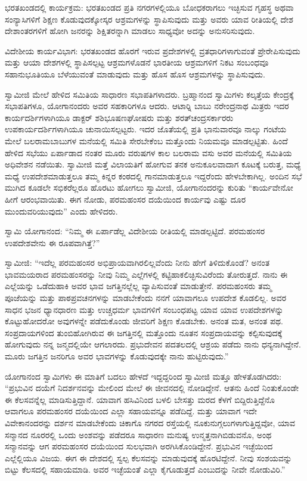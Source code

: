  ಭರತಖಂಡದಲ್ಲಿ ಕಾರ್ಯಕ್ರಮ: ಭರತಖಂಡದ ಪ್ರತಿ ನಗರಗಳಲ್ಲಿಯೂ ಬೋಧಕರಾಗಲು ಇಚ್ಛಿಸುವ ಗೃಹಸ್ಥ ಅಥವಾ ಸಂನ್ಯಾಸಿಗಳಿಗೆ ಶಿಕ್ಷಣ ಕೊಡುವುದಕ್ಕೋಸ್ಕರ ಆಶ್ರಮಗಳನ್ನು ಸ್ಥಾಪಿಸುವುದು ಮತ್ತು ಅವರು ಯಾವ ರೀತಿಯಲ್ಲಿ ದೇಶ ದೇಶಾಂತರಗಳಿಗೆ ಹೋಗಿ ಜನರನ್ನು ಶಿಕ್ಷಿತರನ್ನಾಗಿ ಮಾಡಲು ಸಾಧ್ಯವೋ ಅದನ್ನು ಅನುಸರಿಸುವುದು. 

 ವಿದೇಶೀಯ ಕಾರ್ಯವಿಭಾಗ: ಭರತಖಂಡದ ಹೊರಗೆ ಇರುವ ಪ್ರದೇಶಗಳಲ್ಲಿ ವ್ರತಧಾರಿಗಳಾಗುವಂತೆ ಪ್ರೇರೇಪಿಸುವುದು ಮತ್ತು ಆಯಾ ದೇಶಗಳಲ್ಲಿ ಸ್ಥಾಪಿಸಲ್ಪಟ್ಟ ಆಶ್ರಮಗಳೊಡನೆ ಭಾರತೀಯ ಆಶ್ರಮಗಳಿಗೆ ನಿಕಟ ಸಂಬಂಧವೂ ಸಹಾನುಭೂತಿಯೂ ಬೆಳೆಯುವಂತೆ ಮಾಡುವುದು ಮತ್ತು ಹೊಸ ಹೊಸ ಆಶ್ರಮಗಳನ್ನು ಸ್ಥಾಪಿಸುವುದು. 

 ಸ್ವಾಮೀಜಿ ಮೇಲೆ ಹೇಳಿದ ಸಮಿತಿಯ ಸಾಧಾರಣ ಸಭಾಪತಿಗಳಾದರು. ಬ್ರಹ್ಮಾನಂದ ಸ್ವಾಮಿಗಳು ಕಲ್ಕತ್ತೆಯ ಕೇಂದ್ರಕ್ಕೆ ಸಭಾಪತಿಗಳೂ, ಯೋಗಾನಂದರು ಅವರ ಸಹಕಾರಿಗಳೂ ಆದರು. ಆಟಾರ‍್ನಿ ಬಾಬು ನರೇಂದ್ರನಾಥ ಮಿತ್ರರು ಇದರ ಕಾರ್ಯದರ್ಶಿಗಳಾಗಿಯೂ ಡಾಕ್ಟರ್ ಶಶಿಭೂಷಣಘೋಷರು ಮತ್ತು ಶರತ್‍ಚಂದ್ರಸರ್ಕಾರರು ಉಪಕಾರ್ಯದರ್ಶಿಗಳಾಗಿಯೂ ಚುನಾಯಿಸಲ್ಪಟ್ಟರು. ಇದರ ಜೊತೆಯಲ್ಲಿ ಪ್ರತಿ ಭಾನುವಾರವೂ ನಾಲ್ಕು ಗಂಟೆಯ ಮೇಲೆ ಬಲರಾಮಬಾಬುಗಳ ಮನೆಯಲ್ಲಿ ಸಮಿತಿ ಸೇರಬೇಕೆಂಬ ಮತ್ತೊಂದು ನಿಯಮವೂ ಮಾಡಲ್ಪಟ್ಟಿತು. ಹಿಂದೆ ಹೇಳಿದ ಸಭೆಯು ಏರ್ಪಾಡಾದ ನಂತರ ಮೂರು ವರುಷಗಳ ಕಾಲ ಬಲರಾಮ ವಸು ಅವರ ಮನೆಯಲ್ಲಿ ಸಮಿತಿಯ ಅಧಿವೇಶನ ನಡೆಯಿತು. ಸ್ವಾಮೀಜಿ ಮತ್ತೆ ವಿಲಾಯತಿಗೆ ಹೋಗುವ ತನಕ ಅನುಕೂಲವಾದಾಗ ಕೂಟಕ್ಕೆ ಬರುತ್ತ, ಮಧ್ಯೆ ಮಧ್ಯೆ ಉಪದೇಶಮಾಡುತ್ತಲೂ ತಮ್ಮ ಕಿನ್ನರ ಕಂಠದಲ್ಲಿ ಗಾನಮಾಡುತ್ತಲೂ ಇದ್ದರೆಂದು ಹೇಳಬೇಕಾಗಿಲ್ಲ. ಅಂದಿನ ಸಭೆ ಮುಗಿದ ಕೂಡಲೇ ಸಭಿಕರೆಲ್ಲರೂ ಹೊರಟು ಹೋಗಲು ಸ್ವಾಮೀಜಿ, ಯೋಗಾನಂದರನ್ನು ಕುರಿತು “ಕಾರ್ಯವೇನೋ ಹೀಗೆ ಆರಂಭವಾಯಿತು. ಈಗ ನೋಡು, ಪರಮಹಂಸರ ದಯೆಯಿಂದ ಕಾರ್ಯವು ಎಷ್ಟು ದೂರ ಮುಂದುವರಿಯುವುದು” ಎಂದು ಹೇಳಿದರು. 

 ಸ್ವಾಮಿ ಯೋಗಾನಂದ: “ನಿಮ್ಮ ಈ ಏರ್ಪಾಡೆಲ್ಲ ವಿದೇಶೀಯ ರೀತಿಯಲ್ಲಿ ಮಾಡಲ್ಪಟ್ಟಿದೆ. ಪರಮಹಂಸರ ಉಪದೇಶವೇನು ಈ ರೂಪವಾಗಿತ್ತೆ?” 

 ಸ್ವಾಮೀಜಿ: “ಇದೆಲ್ಲ ಪರಮಹಂಸರ ಅಭಿಪ್ರಾಯವಾಗಿರಲಿಲ್ಲವೆಂದು ನೀನು ಹೇಗೆ ತಿಳಿದುಕೊಂಡೆ? ಅನಂತ ಭಾವಮಯರಾದ ಪರಮಹಂಸರನ್ನು ನೀವು ನಿಮ್ಮ ಎಲ್ಲೆಗಳಲ್ಲಿ ಕಟ್ಟಿಹಾಕಲಿಚ್ಛಿಸುವಿರೆಂದು ತೋರುತ್ತದೆ. ನಾನು ಈ ಎಲ್ಲೆಯನ್ನು ಒಡೆದುಹಾಕಿ ಅವರ ಭಾವ ಜಗತ್ತಿನಲ್ಲೆಲ್ಲ ವ್ಯಾಪಿಸುವಂತೆ ಮಾಡುತ್ತೇನೆ. ಪರಮಹಂಸರು ತಮ್ಮ ಪೂಜೆಯನ್ನು ಮತ್ತು ಪಾಠಪ್ರವಚನಗಳನ್ನು ಮಾಡಬೇಕೆಂದು ನನಗೆ ಯಾವಾಗಲೂ ಉಪದೇಶ ಕೊಡಲಿಲ್ಲ. ಅವರ ಸಾಧನ ಭಜನ ಧ್ಯಾನಧಾರಣ ಮತ್ತು ಉಚ್ಚಧರ್ಮ ಭಾವಗಳಿಗೆ ಸಂಬಂಧಪಟ್ಟ ಯಾವ ಯಾವ ಉಪದೇಶಗಳನ್ನು ಕೊಟ್ಟುಹೋದರೋ ಅವುಗಳನ್ನೇ ಪಡೆದುಕೊಂಡು ಜೀವರಿಗೆ ಶಿಕ್ಷಣ ಕೊಡಬೇಕು. ಅನಂತ ಮತ, ಅನಂತ ಪಥ. ಸಂಪ್ರದಾಯಗಳಿಂದ ತುಂಬಿಹೋಗಿರುವ ಈ ಜಗತ್ತಿನಲ್ಲಿ ಮತ್ತೊಂದು ನೂತನ ಸಂಪ್ರದಾಯವನ್ನು ಕಲ್ಪಿಸುವುದಕ್ಕೆ ಹೋಗುವುದು ನನ್ನ ಜನ್ಮದಲ್ಲಿಯೇ ಆಗಲಾರದು. ಪ್ರಭುದೇವನ ಪದತಲದಲ್ಲಿ ಆಶ್ರಯ ಪಡೆದು ನಾನು ಧನ್ಯನಾಗಿದ್ದೇನೆ. ಮೂರು ಜಗತ್ತಿನ ಜನರಿಗೂ ಅವರ ಭಾವಗಳನ್ನು ಕೊಡುವುದಕ್ಕೇ ನಾನು ಹುಟ್ಟಿರುವುದು.” 

 ಯೋಗಾನಂದ ಸ್ವಾಮಿಗಳು ಈ ಮಾತಿಗೆ ಬದಲು ಹೇಳದೆ ಇದ್ದದ್ದರಿಂದ ಸ್ವಾಮೀಜಿ ಮತ್ತೂ ಹೇಳತೊಡಗಿದರು: “ಪ್ರಭುವಿನ ದಯೆಗೆ ನಿದರ್ಶನವನ್ನು ಮೇಲಿಂದ ಮೇಲೆ ಈ ಜೀವನದಲ್ಲಿ ನೋಡಿದ್ದೇನೆ. ಆತನು ಹಿಂದೆ ನಿಂತುಕೊಂಡೇ ಈ ಕೆಲಸವನ್ನೆಲ್ಲ ಮಾಡಿಸುತ್ತಿದ್ದಾನೆ. ಯಾವಾಗ ಹಸಿವಿನಿಂದ ಬಳಲಿ ಬೇಸತ್ತು ಮರದ ಕೆಳಗೆ ಬಿದ್ದಿರುತ್ತಿದ್ದೆನೊ ಆವಾಗಲೂ ಪರಮಹಂಸರ ದಯೆಯಿಂದ ಎಲ್ಲಾ ಸಹಾಯವನ್ನೂ ಪಡೆದಿದ್ದೆ. ಮತ್ತು ಯಾವಾಗ ಇದೇ ವಿವೇಕಾನಂದರನ್ನು ದರ್ಶನ ಮಾಡಬೇಕೆಂದು ಚಿಕಾಗೊ ನಗರದ ರಸ್ತೆಯಲ್ಲಿ ನೂಕುನುಗ್ಗಲುಗಳಾಗುತ್ತಿದ್ದವೋ, ಯಾವ ಸನ್ಮಾನದ ನೂರರಲ್ಲಿ ಒಂದು ಅಂಶವನ್ನು ಪಡೆದರೂ ಸಾಧಾರಣ ಮನುಷ್ಯ ಉನ್ಮತ್ತನಾಗಿಬಿಡುವನೊ, ಅಂಥ ಸನ್ಮಾನವನ್ನು ಆಗ ಪರಮಹಂಸರ ದಯೆಯಿಂದ ಸುಲಭವಾಗಿ ಅರಗಿಸಿಕೊಂಡಿದ್ದೇನೆ. ಪ್ರಭುವಿನ ಇಚ್ಛೆಯಿಂದ ಎಲ್ಲೆಲ್ಲಿಯೂ ವಿಜಯ. ಈಗ ಈ ದೇಶದಲ್ಲಿ ಸ್ವಲ್ಪ ಕೆಲಸವನ್ನು ಮಾಡುವುದಕ್ಕೆ ಹೊರಟಿದ್ದೇನೆ. ನೀವು ಸಂಶಯವನ್ನು ಬಿಟ್ಟು ಕೆಲಸದಲ್ಲಿ ಸಹಾಯಮಾಡಿ. ಅವರ ಇಚ್ಛೆಯಂತೆ ಎಲ್ಲಾ ಕೈಗೂಡುತ್ತದೆ ಎಂಬುದನ್ನು ನೀವೇ ನೋಡುವಿರಿ.” 

